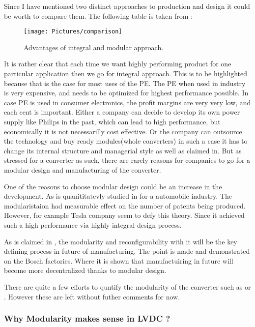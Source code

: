\documentclass[]{scrartcl}
\begin{document}
Since I have mentioned two distinct approaches to production and design it could be worth to compare them. The following table is taken from \cite{JulianaHsuanMikkola2003}:
\begin{figure}[h!]
	\centering
	\texttt{[image: Pictures/comparison]}
	\caption{Advantages of integral and modular approach.}
	\label{fig:comparison}
\end{figure}

It is rather clear that each time we want highly performing product for one particular application then we go for integral approach. This is to be highlighted because that is the case for most uses of the PE. The PE when used in industry is very expensive, and needs to be optimized for highest performance possible. In case PE is used in consumer electronics, the profit margins are very very low, and each cent is important. Either a company can decide to develop its own power supply like Philips in the past, which can lead to high performance, but economically it is not necessarilly cost effective. Or the company can outsource the technology and buy ready modules(whole converters) in such a case it has to change its internal structure and managerial style as well as claimed in\cite{Fine2005}. But as stressed for a converter as such, there are rarely reasons for companies to go for a modular design and manufacturing of the converter. 

One of the reasons to choose modular design could be an increase in the development. As is quanititatevly studied in \cite{Wang2010} for a automobile industry. The modularistaion had measurable effect on the number of patents being produced. However, for example Tesla company seem to defy this theory. Since it achieved such a high performance via highly integral design process. 

As is claimed in \cite{Sch??fer2007}, the modularity and reconfigurability with it will be the key defining process in future of manufacturing. The point is made and demonstrated on the Bosch factories.  Where it is shown that manufactuiring in future will become more decentralized thanks to modular design.

There are quite a few efforts to quntify the modularity of the converter such as \cite{Huang1998} or \cite{Ji2012}. However these are left without futher comments for now. 

\subsubsection{Why Modularity makes sense in LVDC ?}
\end{document}
